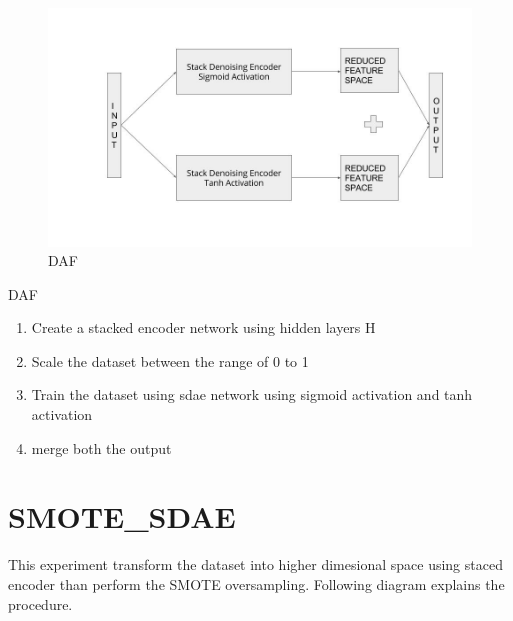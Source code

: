 \documentclass[a4paper,11pt]{report}
\begin{document}
\begin{figure}[ht]
\begin{center}
  \includegraphics[width=\textwidth]{daf}
\end{center}
    \caption{DAF}
  \label{fig:daf}
\end{figure}



\begin{algorithm}
\caption{DAF}\label{euclid}
\begin{algorithmic}

\begin{enumerate}
    \item {Create a stacked encoder network using hidden layers H}
    \item {Scale the dataset between the range of 0 to 1 }
    \item {Train the dataset using sdae network using 
    sigmoid activation and tanh activation}
    \item {merge both the output}
\end{enumerate}

\end{algorithmic}
\end{algorithm}

\section*{SMOTE\_SDAE}

This experiment transform the dataset into higher dimesional space using staced encoder than perform the SMOTE oversampling. Following diagram explains the procedure.
\end{document}
